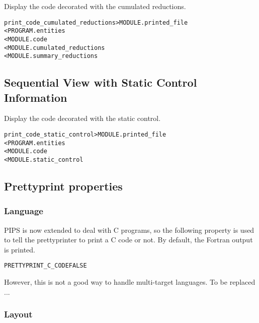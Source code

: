 \documentclass[a4paper]{report}
\newenvironment{PipsProp}{\begin{alltt}}{\end{alltt}}
\newenvironment{PipsMake}{\begin{alltt}}{\end{alltt}}
\begin{document}
Display the code decorated with the cumulated reductions.

\begin{PipsMake}
print_code_cumulated_reductions > MODULE.printed_file
  < PROGRAM.entities
  < MODULE.code
  < MODULE.cumulated_reductions
  < MODULE.summary_reductions
\end{PipsMake}


\subsection{Sequential View with Static Control Information}

Display the code decorated with the static control.

\begin{PipsMake}
print_code_static_control       > MODULE.printed_file
        < PROGRAM.entities
        < MODULE.code
        < MODULE.static_control
\end{PipsMake}


\subsection{Prettyprint properties}


\subsubsection{Language}

PIPS is now extended to deal with C programs, so the following property is
used to tell the prettyprinter to print a C code or not. By default, the
Fortran output is printed.

\begin{PipsProp}
PRETTYPRINT_C_CODE FALSE
\end{PipsProp}

However, this is not a good way to handle multi-target languages. To be
replaced ...

\subsubsection{Layout}
\end{document}
